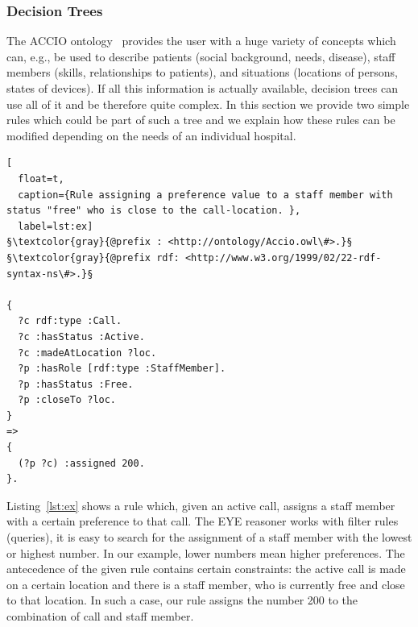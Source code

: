\subsubsection{Decision Trees }




 



 
The ACCIO ontology~\cite{accioont} provides the user with a huge variety of concepts which can, e.g., be used to describe patients (social background, needs, disease), 
staff members (skills, relationships to patients), and situations (locations of persons, states of devices). If all this information is actually available, decision trees
can use all of it and be therefore quite complex. In this section we provide two simple rules which could be part of such a tree and we explain how these rules can
be modified depending on the needs of an individual hospital.
 
 \begin{lstlisting}[
  float=t,
  caption={Rule assigning a preference value to a staff member with status "free" who is close to the call-location. },
  label=lst:ex]
§\textcolor{gray}{@prefix : <http://ontology/Accio.owl\#>.}§
§\textcolor{gray}{@prefix rdf: <http://www.w3.org/1999/02/22-rdf-syntax-ns\#>.}§

{
  ?c rdf:type :Call.
  ?c :hasStatus :Active. 
  ?c :madeAtLocation ?loc. 
  ?p :hasRole [rdf:type :StaffMember].
  ?p :hasStatus :Free.
  ?p :closeTo ?loc.
}
=>
{
  (?p ?c) :assigned 200.
}.
\end{lstlisting}
 
Listing~\ref{lst:ex} shows a rule which, given an active call, assigns a staff member with a certain preference to that call. The EYE reasoner works 
with filter rules (queries), it is easy to search for the assignment of a staff member with the lowest or highest number. 
In our example, lower numbers mean higher preferences. The antecedence of the given rule contains certain constraints: the active call is made on a certain location and
there is a staff member, who is currently free and close to that location. In such a case, our rule assigns the number 200 to the combination of call and staff member.

